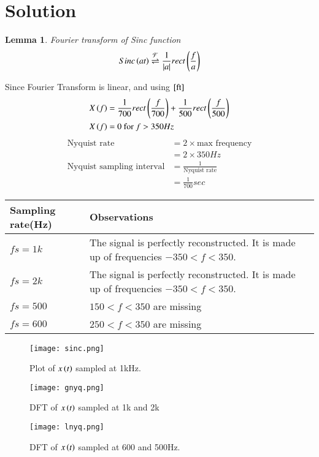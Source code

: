 \documentclass[journal,12pt,twocolumn]{IEEEtran}
\newtheorem{lemma}[theorem]{Lemma}
\begin{document}
\section{Solution}
\begin{lemma}{Fourier transform of Sinc function}
\begin{align}
    Sinc\left(at\right) \overset{\mathcal{F}}{ \rightleftharpoons} \frac{1}{|a|}rect\left(\frac{f}{a}\right)\label{ft}
\end{align}
\end{lemma}
Since Fourier Transform is linear, and using $\eqref{ft}$
\begin{align}
    X\left(f\right)&=\frac{1}{700}rect\left(\frac{f}{700}\right)+\frac{1}{500}rect\left(\frac{f}{500}\right)\\
    X\left(f\right)&=0  \text{   for } f>350Hz
\end{align}
\begin{align}
    \text{Nyquist rate} &= 2 \times \text{max frequency}\\
    &= 2\times 350 Hz\\
    \text{Nyquist sampling interval} &= \frac{1}{\text{Nyquist rate}}\\
    &= \frac{1}{700}sec
\end{align}
\begin{center}
\begin{tabular}{ |m{2cm}|m{4.5cm}| } 
 \hline
 Sampling rate(Hz) & Observations \\
 \hline
 $fs=1k$& The signal is perfectly reconstructed. It is made up of frequencies $-350<f<350$. \\
 \hline
 $fs=2k$ & The signal is perfectly reconstructed. It is made up of frequencies $-350<f<350$. \\
 \hline
 $fs=500$ & $150<f<350$ are missing   \\ 
 \hline
 $fs=600$ & $250<f<350$ are missing  \\ 
 \hline
\end{tabular}
\end{center}
\begin{figure}[!h]
 \centering
 \texttt{[image: sinc.png]}
 \caption{Plot of $x\left(t\right)$ sampled at 1kHz.} 
\end{figure}
\begin{figure}[!h]
 \centering
 \texttt{[image: gnyq.png]}
 \caption{DFT of $x\left(t\right)$ sampled at 1k and 2k} 
\end{figure}
\begin{figure}[!h]
 \centering
 \texttt{[image: lnyq.png]}
 \caption{DFT of $x\left(t\right)$ sampled at 600 and 500Hz.} 
\end{figure}
\end{document}
